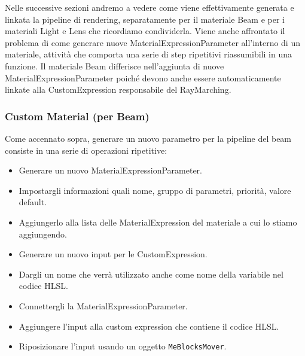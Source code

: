 \documentclass[main.tex]{subfiles}
\begin{document}
Nelle successive sezioni andremo a vedere come viene effettivamente generata e linkata la pipeline di rendering, separatamente per il materiale Beam e per i materiali Light e Lens che ricordiamo condividerla. Viene anche affrontato il problema di come generare nuove MaterialExpressionParameter all'interno di un materiale, attività che comporta una serie di step ripetitivi riassumibili in una funzione. Il materiale Beam differisce nell'aggiunta di nuove MaterialExpressionParameter poiché devono anche essere automaticamente linkate alla CustomExpression responsabile del RayMarching.

\subsubsection{Custom Material (per Beam)}\label{subsec:2_3_CM}
Come accennato sopra, generare un nuovo parametro per la pipeline del beam consiste in una serie di operazioni ripetitive:
\begin{itemize}
    \item Generare un nuovo MaterialExpressionParameter.
    \item Impostargli informazioni quali nome, gruppo di parametri, priorità, valore default.
    \item Aggiungerlo alla lista delle MaterialExpression del materiale a cui lo stiamo aggiungendo.
    \item Generare un nuovo input per le CustomExpression.
    \item Dargli un nome che verrà utilizzato anche come nome della variabile nel codice HLSL.
    \item Connettergli la MaterialExpressionParameter.
    \item Aggiungere l'input alla custom expression che contiene il codice HLSL.
    \item Riposizionare l'input usando un oggetto \lstinline{MeBlocksMover}.
\end{itemize}
\end{document}

